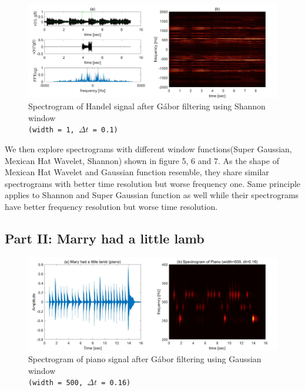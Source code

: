 \documentclass[10pt,a4paper]{article}
\numberwithin{equation}{subsection}
\begin{document}
\begin{figure}[H]
\begin{center}
\includegraphics[scale=0.22]{f7.jpg}
\caption{Spectrogram of Handel signal after G\'abor filtering using Shannon window\\ \texttt{(width = 1, $\Delta t$ = 0.1)}}
\end{center}
\end{figure}
	
We then explore spectrograms with different window functions(Super Gaussian, Mexican Hat Wavelet, Shannon) shown in figure 5, 6 and 7. As the shape of Mexican Hat Wavelet and Gaussian function resemble, they share similar spectrograms with better time resolution but worse frequency one. Same principle applies to Shannon and Super Gaussian function as well while their spectrograms have better frequency resolution but worse time resolution.

\subsection*{Part II: Marry had a little lamb}
\begin{figure}[H]
\begin{center}
\includegraphics[scale=0.22]{f8.jpg}
\caption{Spectrogram of piano signal after G\'abor filtering using Gaussian window\\ \texttt{(width = 500, $\Delta t$ = 0.16)}}
\end{center}
\end{figure}
	
\end{document}
